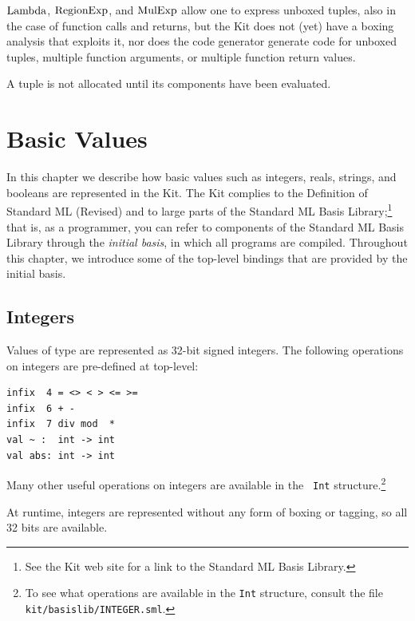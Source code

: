 \documentclass[12pt]{book}
\begin{document}
$\hbox{\rm Lambda}$, $\hbox{\rm RegionExp}$, and $\hbox{\rm MulExp}$ allow one to express unboxed tuples, 
also in the case of function calls and returns, but the Kit does not 
(yet) have a boxing analysis that exploits it, nor does the 
code generator generate code for unboxed tuples, multiple function arguments,
or multiple function return values.

A tuple is not allocated until its components have been evaluated.


\chapter{Basic Values}
In this chapter we describe how basic values such as integers, reals,
strings, and booleans are represented in the Kit. The Kit complies to
the Definition of Standard ML (Revised) and to large parts of the Standard ML Basis
Library;\footnote{See the Kit web site for a link to the Standard ML
  Basis Library.} that is, as a
programmer, you can refer to components of the Standard ML Basis
Library through the {\em initial basis}, in which all programs are
compiled.  Throughout this chapter, we introduce some of the
top-level bindings that are provided by the initial basis.

\section{Integers}
\label{integers.sec}
Values of type  are represented as 32-bit signed integers.
The following operations on integers are 
pre-defined at top-level:\index{{\tt =}}\index{{\tt <>}}\index{{\tt <}}\index{{\tt >}}\index{{\tt <=}}\index{{\tt >=}}\index{{\tt +}}\index{{\tt -}}\index{{\tt *}}\index{\verb+~+}
\begin{verbatim}
infix  4 = <> < > <= >= 
infix  6 + - 
infix  7 div mod  * 
val ~ :  int -> int
val abs: int -> int
\end{verbatim}
Many other useful operations on integers are available in the {\tt
  Int} structure.\footnote{To see what operations are available in the
  {\tt Int} structure, consult the file {\tt
    kit/basislib/INTEGER.sml}.}

At runtime, integers are represented without any form of boxing or tagging, so
all 32 bits are available. 
\end{document}
